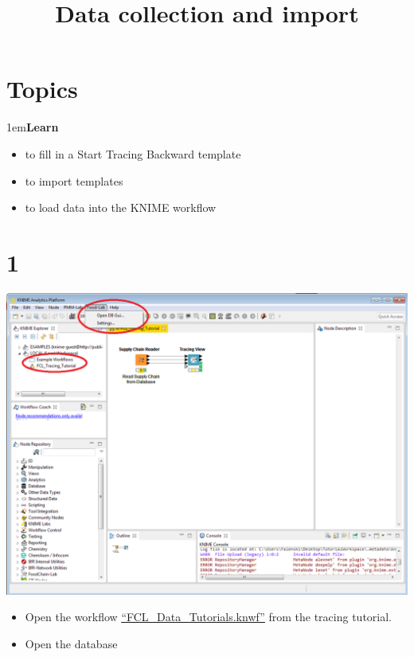 \documentclass[10pt]{beamer}
\title{Data collection and import}
\date{}
\begin{document}
\maketitle

\section{Topics}
\begin{frame}
\leftskip1em\textbf{Learn}
	\begin{itemize}
		\item to fill in a Start Tracing Backward template
    \item to import templates
    \item to load data into the KNIME workflow
	\end{itemize}
\end{frame}

\section{1}
\begin{frame}
	\begin{center}
		\includegraphics[height=0.6\textheight]{1.png}
	\end{center}
	\begin{itemize}
		\item Open the workflow \textcolor{blue}{\underline{\href{https://github.com/SiLeBAT/BfROpenLabResources/raw/master/GitHubPages/workflows/FCL\_Data\_Tutorials.knwf}{``FCL\_Data\_Tutorials.knwf''}}} from the tracing tutorial.
    \item Open the database
	\end{itemize}
\end{frame}
\end{document}
